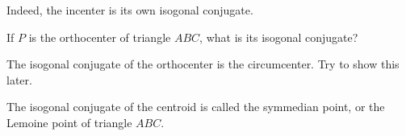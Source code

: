 



\begin{note*}
Indeed, the incenter is its own isogonal conjugate.
\end{note*}
If $P$ is the orthocenter of triangle $ABC$, what is its isogonal conjugate?








\begin{note*}
    The isogonal conjugate of the orthocenter is the circumcenter. Try to show this later.    
\end{note*}







\begin{note*}
    The isogonal conjugate of the centroid is called the symmedian point, or the Lemoine point of triangle $ABC$.    
\end{note*}


